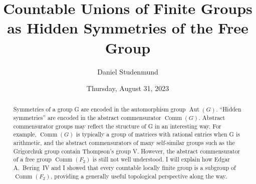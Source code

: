 \documentclass{UAmathtalk}
\author{Daniel Studenmund}
\title{Countable Unions of Finite Groups as Hidden Symmetries of the Free Group}
\date{Thursday, August 31, 2023}
\begin{document}
\maketitle

\begin{abstract}
Symmetries of a group G are encoded in the automorphism group $\operatorname{Aut}(G)$. ``Hidden symmetries'' are encoded in the abstract commensurator $\operatorname{Comm}(G)$. Abstract commensurator groups may reflect the structure of G in an interesting way. For example, $\operatorname{Comm}(G)$ is typically a group of matrices with rational entries when G is arithmetic, and the abstract commensurators of many self-similar groups such as the Grigorchuk group contain Thompson's group V. However, the abstract commensurator of a free group $\operatorname{Comm}(F_2)$ is still not well understood. I will explain how Edgar A.\ Bering~IV and I showed that every countable locally finite group is a subgroup of $\operatorname{Comm}(F_2)$, providing a generally useful topological perspective along the way.
\end{abstract}
\end{document}
